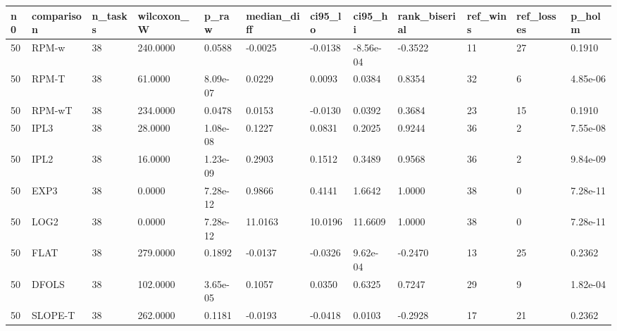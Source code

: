 \begin{tabular}{llllllllllll}
\hline
n0 & comparison & n\_tasks & wilcoxon\_W & p\_raw & median\_diff & ci95\_lo & ci95\_hi & rank\_biserial & ref\_wins & ref\_losses & p\_holm \\
\hline
50 & RPM-w & 38 & 240.0000 & 0.0588 & -0.0025 & -0.0138 & -8.56e-04 & -0.3522 & 11 & 27 & 0.1910 \\
50 & RPM-T & 38 & 61.0000 & 8.09e-07 & 0.0229 & 0.0093 & 0.0384 & 0.8354 & 32 & 6 & 4.85e-06 \\
50 & RPM-wT & 38 & 234.0000 & 0.0478 & 0.0153 & -0.0130 & 0.0392 & 0.3684 & 23 & 15 & 0.1910 \\
50 & IPL3 & 38 & 28.0000 & 1.08e-08 & 0.1227 & 0.0831 & 0.2025 & 0.9244 & 36 & 2 & 7.55e-08 \\
50 & IPL2 & 38 & 16.0000 & 1.23e-09 & 0.2903 & 0.1512 & 0.3489 & 0.9568 & 36 & 2 & 9.84e-09 \\
50 & EXP3 & 38 & 0.0000 & 7.28e-12 & 0.9866 & 0.4141 & 1.6642 & 1.0000 & 38 & 0 & 7.28e-11 \\
50 & LOG2 & 38 & 0.0000 & 7.28e-12 & 11.0163 & 10.0196 & 11.6609 & 1.0000 & 38 & 0 & 7.28e-11 \\
50 & FLAT & 38 & 279.0000 & 0.1892 & -0.0137 & -0.0326 & 9.62e-04 & -0.2470 & 13 & 25 & 0.2362 \\
50 & DFOLS & 38 & 102.0000 & 3.65e-05 & 0.1057 & 0.0350 & 0.6325 & 0.7247 & 29 & 9 & 1.82e-04 \\
50 & SLOPE-T & 38 & 262.0000 & 0.1181 & -0.0193 & -0.0418 & 0.0103 & -0.2928 & 17 & 21 & 0.2362 \\
\hline
\end{tabular}
